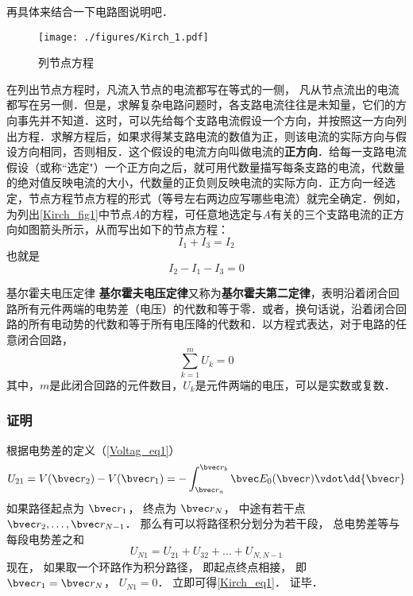 再具体来结合一下电路图说明吧．
\begin{figure}[ht]
\centering
\texttt{[image: ./figures/Kirch\_1.pdf]}
\caption{列节点方程} \label{Kirch_fig1}
\end{figure}
在列出节点方程时，凡流入节点的电流都写在等式的一侧， 凡从节点流出的电流都写在另一侧．但是，求解复杂电路问题时，各支路电流往往是未知量，它们的方向事先并不知道．这时，可以先给每个支路电流假设一个方向，并按照这一方向列出方程．求解方程后，如果求得某支路电流的数值为正，则该电流的实际方向与假设方向相同，否则相反．这个假设的电流方向叫做电流的\textbf{正方向}．给每一支路电流假设（或称“选定"）一个正方向之后，就可用代数量描写每条支路的电流，代数量的绝对值反映电流的大小，代数量的正负则反映电流的实际方向．正方向一经选定，节点方程节点方程的形式（等号左右两边应写哪些电流）就完全确定．例如，为列出\autoref{Kirch_fig1}中节点$A$的方程，可任意地选定与$A $有关的三个支路电流的正方向如图箭头所示，从而写出如下的节点方程：
\begin{equation}
I_1+I_3=I_2
\end{equation}
也就是
\begin{equation}
I_2-I_1-I_3=0
\end{equation}
\begin{theorem}{基尔霍夫电压定律}
\textbf{基尔霍夫电压定律}又称为\textbf{基尔霍夫第二定律}，表明沿着闭合回路所有元件两端的电势差（电压）的代数和等于零．或者，换句话说，沿着闭合回路的所有电动势的代数和等于所有电压降的代数和．以方程式表达，对于电路的任意闭合回路，
\begin{equation}\label{Kirch_eq1}
\sum_{k=1}^m U_k = 0
\end{equation}
其中，$m$是此闭合回路的元件数目，$U_k$是元件两端的电压，可以是实数或复数．
\end{theorem}

\subsubsection{证明}
根据电势差的定义（\autoref{Voltag_eq1}）
\begin{equation}
U_{21} = V(\bvec r_2) - V(\bvec r_1) = - \int_{\bvec r_a}^{\bvec r_b} \bvec E_0(\bvec r) \vdot \dd{\bvec r}
\end{equation}
如果路径起点为 $\bvec r_1$， 终点为 $\bvec r_N$， 中途有若干点 $\bvec r_2, \dots, \bvec r_{N-1}$． 那么有可以将路径积分划分为若干段， 总电势差等与每段电势差之和
\begin{equation}
U_{N1} = U_{21} + U_{32} + \dots + U_{N, N-1}
\end{equation}
现在， 如果取一个环路作为积分路径， 即起点终点相接， 即 $\bvec r_1 = \bvec r_N$， $U_{N1} = 0$． 立即可得\autoref{Kirch_eq1}． 证毕．

